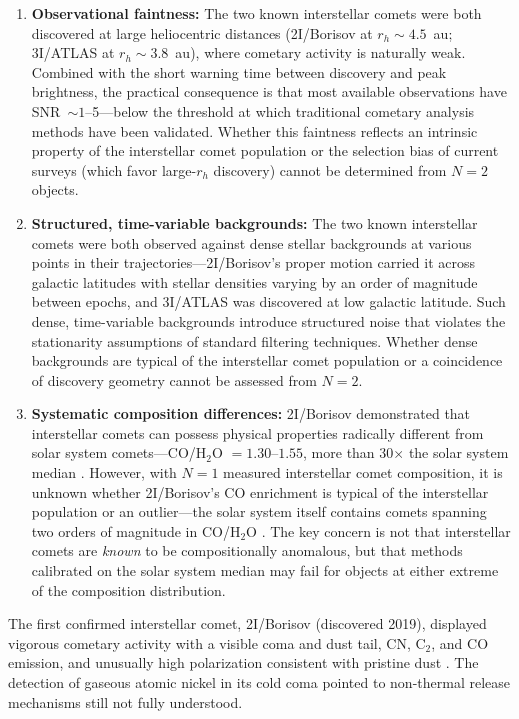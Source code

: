 \documentclass[usenatbib]{mnras}
\begin{document}
\begin{enumerate}
    \item \textbf{Observational faintness:} The two known interstellar comets were both discovered at large heliocentric distances (2I/Borisov at $r_h \sim 4.5$~au; 3I/ATLAS at $r_h \sim 3.8$~au), where cometary activity is naturally weak. Combined with the short warning time between discovery and peak brightness, the practical consequence is that most available observations have SNR~$\sim 1$--5---below the threshold at which traditional cometary analysis methods have been validated. Whether this faintness reflects an intrinsic property of the interstellar comet population or the selection bias of current surveys (which favor large-$r_h$ discovery) cannot be determined from $N=2$ objects.
    \item \textbf{Structured, time-variable backgrounds:} The two known interstellar comets were both observed against dense stellar backgrounds at various points in their trajectories---2I/Borisov's proper motion carried it across galactic latitudes with stellar densities varying by an order of magnitude between epochs, and 3I/ATLAS was discovered at low galactic latitude. Such dense, time-variable backgrounds introduce structured noise that violates the stationarity assumptions of standard filtering techniques. Whether dense backgrounds are typical of the interstellar comet population or a coincidence of discovery geometry cannot be assessed from $N=2$.
    \item \textbf{Systematic composition differences:} 2I/Borisov demonstrated that interstellar comets can possess physical properties radically different from solar system comets---CO/H$_2$O $= 1.30$--$1.55$, more than 30$\times$ the solar system median \citep{bodewits20,opitom21}. However, with $N=1$ measured interstellar comet composition, it is unknown whether 2I/Borisov's CO enrichment is typical of the interstellar population or an outlier---the solar system itself contains comets spanning two orders of magnitude in CO/H$_2$O \citep{bockelee04}. The key concern is not that interstellar comets are \textit{known} to be compositionally anomalous, but that methods calibrated on the solar system median may fail for objects at either extreme of the composition distribution.
\end{enumerate}

The first confirmed interstellar comet, 2I/Borisov (discovered 2019), displayed vigorous cometary activity with a visible coma and dust tail, CN, C$_2$, and CO emission, and unusually high polarization consistent with pristine dust \citep{guzik19,jewitt19,fitzsimmons19,bodewits20,bagnulo21}. The detection of gaseous atomic nickel in its cold coma \citep{guzik21} pointed to non-thermal release mechanisms still not fully understood.
\end{document}
